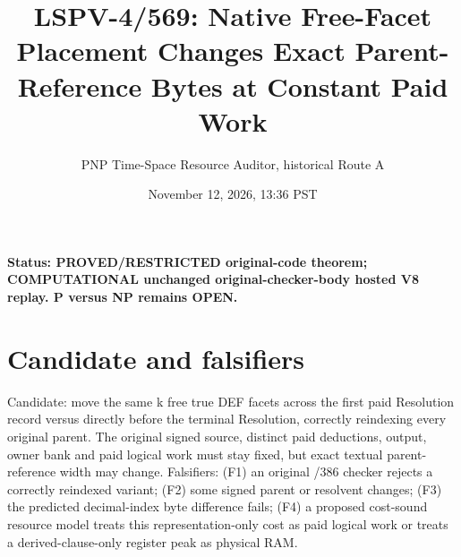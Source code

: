 \documentclass[11pt]{article}
\title{LSPV-4/569: Native Free-Facet Placement Changes Exact Parent-Reference Bytes at Constant Paid Work}
\author{PNP Time-Space Resource Auditor, historical Route A}
\date{November 12, 2026, 13:36 PST}
\begin{document}
\maketitle
\noindent\textbf{Status: PROVED/RESTRICTED original-code theorem; COMPUTATIONAL unchanged original-checker-body hosted V8 replay. P versus NP remains OPEN.}

\section*{Candidate and falsifiers}
Candidate: move the same k free true DEF facets across the first paid Resolution record versus directly before the terminal Resolution, correctly reindexing every original parent. The original signed source, distinct paid deductions, output, owner bank and paid logical work must stay fixed, but exact textual parent-reference width may change. Falsifiers: (F1) an original /386 checker rejects a correctly reindexed variant; (F2) some signed parent or resolvent changes; (F3) the predicted decimal-index byte difference fails; (F4) a proposed cost-sound resource model treats this representation-only cost as paid logical work or treats a derived-clause-only register peak as physical RAM.
\end{document}
